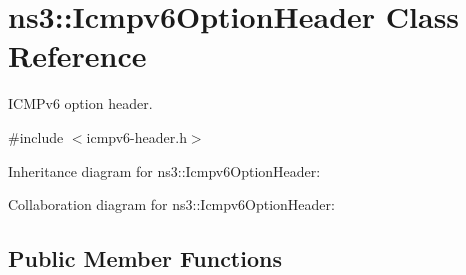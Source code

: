 \hypertarget{classns3_1_1Icmpv6OptionHeader}{}\section{ns3\+:\+:Icmpv6\+Option\+Header Class Reference}
\label{classns3_1_1Icmpv6OptionHeader}


I\+C\+M\+Pv6 option header.  




{\ttfamily \#include $<$icmpv6-\/header.\+h$>$}



Inheritance diagram for ns3\+:\+:Icmpv6\+Option\+Header\+:


Collaboration diagram for ns3\+:\+:Icmpv6\+Option\+Header\+:
\subsection*{Public Member Functions}
